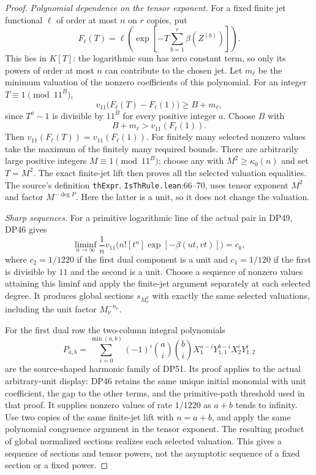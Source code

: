 \begin{proof}
\emph{Polynomial dependence on the tensor exponent.}
For a fixed finite jet functional $\ell$ of order at most $n$ on $r$ copies, put
\[
 F_\ell(T)=\ell\left(
 \exp\left[-T\sum_{b=1}^r\beta(Z^{(b)})\right]\right).
\]
This lies in $K[T]$: the logarithmic sum has zero constant term, so only its powers of order at most $n$ can contribute to the chosen jet.
Let $m_\ell$ be the minimum valuation of the nonzero coefficients of this polynomial. For an integer $T\equiv1\pmod{11^B}$,
\[
 v_{11}\bigl(F_\ell(T)-F_\ell(1)\bigr)\ge B+m_\ell,
\]
since $T^a-1$ is divisible by $11^B$ for every positive integer $a$.
Choose $B$ with
\[
 B+m_\ell>v_{11}(F_\ell(1)).
\]
Then $v_{11}(F_\ell(T))=v_{11}(F_\ell(1))$.
For finitely many selected nonzero values take the maximum of the finitely many required bounds.
There are arbitrarily large positive integers $M\equiv1\pmod{11^B}$; choose any with $M^2\ge\kappa_0(n)$ and set $T=M^2$.
The exact finite-jet lift then proves all the selected valuation equalities.
The source's definition \texttt{thExpr}, \texttt{IsThRule.lean}:66--70, uses tensor exponent $M^2$ and factor $M^{-\deg P}$. Here the latter is a unit, so it does not change the valuation.

\emph{Sharp sequences.}
For a primitive logarithmic line of the actual pair in DP49, DP46 gives
\[
 \liminf_{n\longrightarrow\infty}
 \frac1n v_{11}\bigl(n![t^n]\exp[-\beta(ut,vt)]\bigr)
 =c_k,
\]
where $c_2=1/1220$ if the first dual component is a unit and $c_1=1/120$ if the first is divisible by $11$ and the second is a unit.
Choose a sequence of nonzero values attaining this liminf and apply the finite-jet argument separately at each selected degree.
It produces global sections $s_{M_\nu^2}$ with exactly the same selected valuations, including the unit factor $M_\nu^{-n_\nu}$.

For the first dual row the two-column integral polynomials
\[
 P_{a,b}=\sum_{i=0}^{\min(a,b)}(-1)^i
 \binom ai\binom bi
 X_1^{a-i}Y_{1,1}^{b-i}X_2^iY_{1,2}^i
\]
are the source-shaped harmonic family of DP51.
Its proof applies to the actual arbitrary-unit display: DP46 retains the same unique initial monomial with unit coefficient, the gap to the other terms, and the primitive-path threshold used in that proof.
It supplies nonzero values of rate $1/1220$ as $a+b$ tends to infinity. Use two copies of the same finite-jet lift with $n=a+b$, and apply the same polynomial congruence argument in the tensor exponent. The resulting product of global normalized sections realizes each selected valuation.
This gives a sequence of sections and tensor powers, not the asymptotic sequence of a fixed section or a fixed power.


\end{proof}
